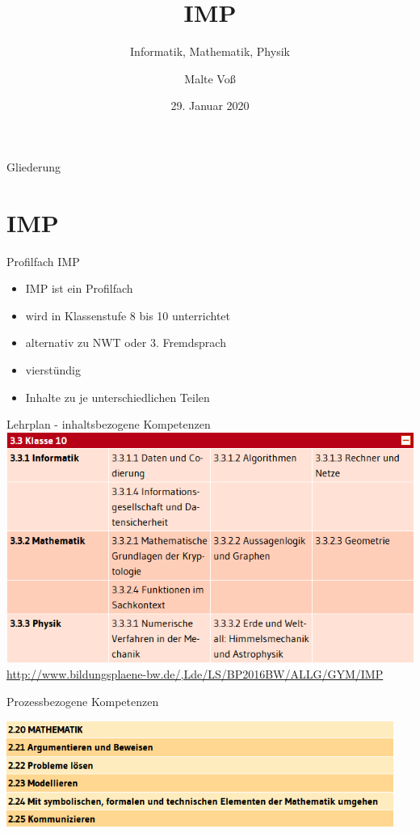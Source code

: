 \documentclass[18pt]{beamer}
\title[IMP]{IMP}
\subtitle{Informatik, Mathematik, Physik}
\author{Malte Vo\ss}
\institute{Abteilung für Didaktik der Mathematik}
\date{29. Januar 2020}
\begin{document}

\begin{frame}
\titlepage
\end{frame}

\begin{frame}{Gliederung}
\tableofcontents
\end{frame}

\section{IMP}
    \begin{frame}{Profilfach IMP}
        \begin{itemize}[<+->]
            \item IMP ist ein Profilfach
            \item wird in Klassenstufe 8 bis 10 unterrichtet
            \item alternativ zu NWT oder 3. Fremdsprach
            \item vierstündig
            \item Inhalte zu je unterschiedlichen Teilen
        \end{itemize}
    \end{frame}

    \begin{frame}{Lehrplan - inhaltsbezogene Kompetenzen}
        \includegraphics[keepaspectratio, width=\textwidth]{figures/IMP_10}
        \cite{bildungsp}
        \tiny\url{http://www.bildungsplaene-bw.de/,Lde/LS/BP2016BW/ALLG/GYM/IMP}
    \end{frame}

    \begin{frame}{Prozessbezogene Kompetenzen}
    
        \includegraphics[keepaspectratio, width=0.95\textwidth]{figures/IMP_Prozess.png}
        \cite{bildungsp}
        \pause

    \end{frame}
        
\end{document}
